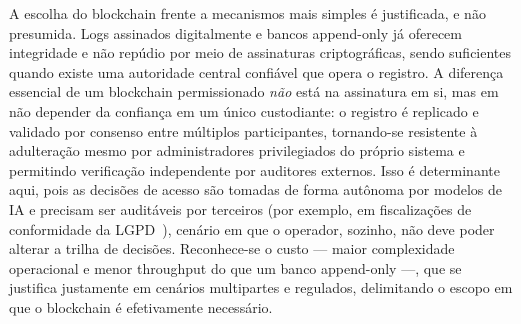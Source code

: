 \documentclass[conference]{IEEEtran}
\begin{document}
A escolha do blockchain frente a mecanismos mais simples é justificada, e
não presumida. Logs assinados digitalmente e bancos append-only já
oferecem integridade e não repúdio por meio de assinaturas
criptográficas, sendo suficientes quando existe uma autoridade central
confiável que opera o registro. A diferença essencial de um blockchain
permissionado \emph{não} está na assinatura em si, mas em não depender da
confiança em um único custodiante: o registro é replicado e validado por
consenso entre múltiplos participantes, tornando-se resistente à
adulteração mesmo por administradores privilegiados do próprio sistema e
permitindo verificação independente por auditores externos. Isso é
determinante aqui, pois as decisões de acesso são tomadas de forma
autônoma por modelos de IA e precisam ser auditáveis por terceiros (por
exemplo, em fiscalizações de conformidade da LGPD~\cite{lgpd2018}),
cenário em que o operador, sozinho, não deve poder alterar a trilha de
decisões. Reconhece-se o custo --- maior complexidade operacional e menor
throughput do que um banco append-only ---, que se justifica justamente
em cenários multipartes e regulados, delimitando o escopo em que o
blockchain é efetivamente necessário.
\end{document}

